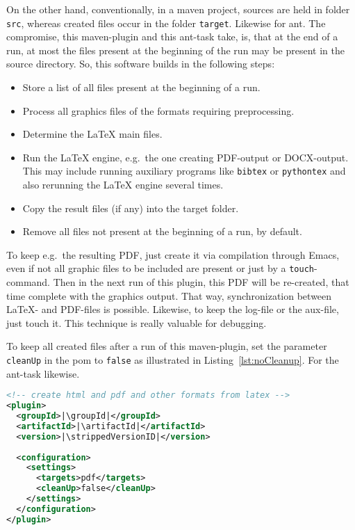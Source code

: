 On the other hand, 
conventionally, in a maven project, 
sources are held in folder \texttt{src}, 
whereas created files occur in the folder \texttt{target}. 
Likewise for ant. 
The compromise, this maven-plugin and this ant-task take, 
is, that at the end of a run, 
at most the files present at the beginning of the run 
may be present in the source directory. 
So, this software builds in the following steps: 
%
\begin{itemize}
\item
Store a list of all files present at the beginning of a run.
\item
Process all graphics files of the formats requiring preprocessing.
\item
Determine the \LaTeX{} main files.
\item
Run the \LaTeX{} engine, e.g.~the one creating PDF-output or DOCX-output.
This may include running auxiliary programs like \texttt{bibtex} or \texttt{pythontex} 
and also rerunning the \LaTeX{} engine several times. 
\item
Copy the result files (if any) into the target folder.
\item
Remove all files not present at the beginning of a run, by default. 
\end{itemize}

To keep e.g.~the resulting PDF, 
just create it via compilation through Emacs, 
even if not all graphic files to be included are present 
or just by a \texttt{touch}-command. 
Then in the next run of this plugin, 
this PDF will be re-created, 
that time complete with the graphics output. 
That way, synchronization between \LaTeX- and PDF-files is possible. 
Likewise, to keep the log-file or the aux-file, just touch it. 
This technique is really valuable for debugging. 

To keep all created files after a run of this maven-plugin, 
set the parameter \texttt{cleanUp} in the pom 
to \texttt{false} as illustrated in Listing~\ref{lst:noCleanup}. 
For the ant-task likewise. 

\begin{lstlisting}[language=xml, basicstyle=\small,
escapechar=|,
float=b, captionpos=b, label={lst:noCleanup},
caption={Configuration without cleanup}]
<!-- create html and pdf and other formats from latex -->
<plugin>
  <groupId>|\groupId|</groupId>
  <artifactId>|\artifactId|</artifactId>
  <version>|\strippedVersionID|</version>
	
  <configuration>
    <settings>
      <targets>pdf</targets>
      <cleanUp>false</cleanUp>
    </settings>
  </configuration>
</plugin>
\end{lstlisting}


